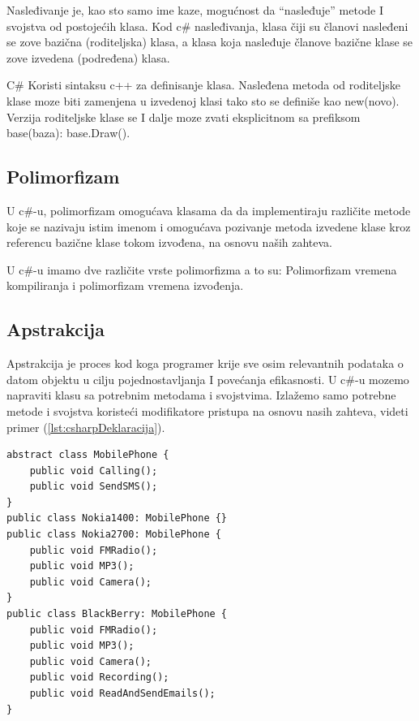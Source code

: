 \documentclass[a4paper]{article}
\begin{document}
Nasleđivanje je, kao sto samo ime kaze, mogućnost da “nasleđuje” metode I svojstva od postojećih klasa.
Kod c\# nasleđivanja, klasa čiji su članovi nasleđeni se zove bazična (roditeljska) klasa, a klasa koja nasleđuje članove bazične klase se zove izvedena (podređena) klasa.

C\# Koristi sintaksu c++ za definisanje klasa.
Nasleđena metoda od roditeljske klase moze biti zamenjena u izvedenoj klasi tako sto se definiše kao new(novo).
Verzija roditeljske klase se I dalje moze zvati eksplicitnom sa prefiksom base(baza): base.Draw().

\subsection{Polimorfizam}
\label{subsec:csharpPolimorfizam}

U c\#-u, polimorfizam omogućava klasama da da implementiraju različite metode koje se nazivaju istim imenom i omogućava pozivanje metoda izvedene klase kroz referencu bazične klase tokom izvođena, na osnovu naših zahteva.

U c\#-u imamo dve različite vrste polimorfizma a to su: Polimorfizam vremena kompiliranja i polimorfizam vremena izvođenja.

\subsection{Apstrakcija}
\label{subsec:csharpApstrakcija}

Apstrakcija je proces kod koga programer krije sve osim relevantnih podataka o datom objektu u cilju pojednostavljanja I povećanja efikasnosti.
U c\#-u mozemo napraviti klasu sa potrebnim metodama i svojstvima. Izlažemo samo potrebne metode i svojstva koristeći modifikatore pristupa na osnovu nasih zahteva, videti primer (\ref{lst:csharpDeklaracija}).

\begin{lstlisting}[caption={Primer deklarisanja apstraktivne klase u C\#-u},frame=single, label=lst:csharpDeklaracija]
abstract class MobilePhone {  
    public void Calling();  
    public void SendSMS();  
}  
public class Nokia1400: MobilePhone {}  
public class Nokia2700: MobilePhone {  
    public void FMRadio();  
    public void MP3();  
    public void Camera();  
}  
public class BlackBerry: MobilePhone {  
    public void FMRadio();  
    public void MP3();  
    public void Camera();  
    public void Recording();  
    public void ReadAndSendEmails();  
} 
\end{lstlisting}
\end{document}
